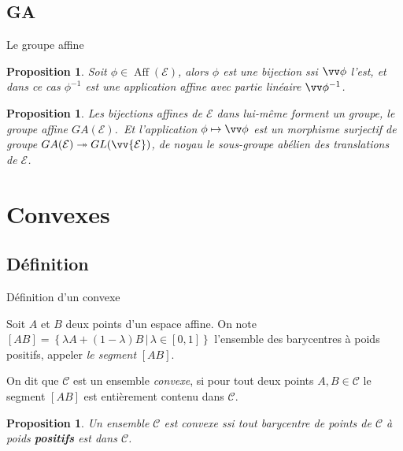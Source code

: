 \documentclass[aspectratio=1610 %
]{beamer}
\newcommand{\myemph}[1]{\textcolor{green!70!black}{\emph{#1}}}
\newtheorem{proposition}[theorem]{Proposition}
\DeclareMathOperator{\Aff}{Aff}
\begin{document}
\subsection{GA}
  \begin{frame}{Le groupe affine}
    \begin{proposition}
      Soit $\phi\in\Aff(\mathcal{E})$, alors $\phi$ est une bijection ssi $\vv\phi$ l'est, et dans ce cas $\phi^{-1}$ est une application affine avec partie linéaire $\vv\phi^{-1}$.
    \end{proposition}\pause
    \begin{proposition}
      Les bijections affines de $\mathcal{E}$ dans lui-même forment un groupe, le groupe affine $GA(\mathcal{E})$.\pause\ Et l'application $\phi\mapsto\vv\phi$ est un morphisme surjectif de groupe $GA(\mathcal{E})\twoheadrightarrow GL(\vv{\mathcal{E}})$\pause, de noyau le sous-groupe abélien des translations de $\mathcal{E}$.
    \end{proposition}
  \end{frame}
\section{Convexes}
\subsection{Définition}
\begin{frame}{Définition d'un convexe}
  \begin{definition}
    Soit $A$ et $B$ deux points d'un espace affine. On note $[AB]=\left\{\lambda A + (1-\lambda)B\,|\, \lambda \in [0,1]\right\}$ l'ensemble des barycentres à poids positifs, appeler \myemph{le segment} $[AB]$.
  \end{definition}\pause
  \begin{definition}
    On dit que $\mathcal{C}$ est un ensemble \myemph{convexe}, si pour tout deux points $A,B \in \mathcal{C}$ le segment $[AB]$ est entièrement contenu dans $\mathcal{C}$.
  \end{definition}\pause
  \begin{proposition}
    Un ensemble $\mathcal{C}$ est convexe ssi tout barycentre de points de $\mathcal{C}$ à poids \textbf{positifs} est dans $\mathcal{C}$.
  \end{proposition}
\end{frame}
\end{document}
